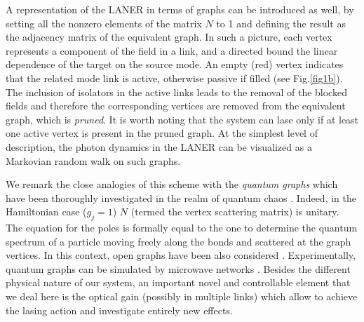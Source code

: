 \documentclass[aps,prl,twocolumn,showpacs,amsmath,amssymb,floatfix,superscriptaddress,
]{revtex4-1}
\begin{document}
A representation of the LANER in terms of graphs can be introduced as well, by setting all the nonzero elements of the matrix $N$ to 1 and defining the result as the adjacency matrix of the equivalent graph. In such a picture, each vertex represents a component of the field in a link, and a directed bound the linear dependence of the target on the source mode. An empty (red) vertex indicates that the related mode link is active, otherwise passive if filled (see Fig.\ref{fig1b}).  The inclusion of isolators in the active links leads to the removal of the blocked fields and therefore the corresponding vertices are removed from the equivalent graph, which is {\it pruned}. It is worth noting that the system can lase only if at least one active vertex is present in the pruned graph. At the simplest level of description, the photon dynamics in the LANER can be visualized as a Markovian random walk \cite{Burioni2005} on such graphs. 

We remark the close analogies of this scheme with the \textit{quantum graphs} which have been thoroughly investigated in the realm of quantum chaos  \cite{kuchment2004quantum,kottos1999periodic}. Indeed, in the Hamiltonian case ($g_j=1$) $N$ (termed the vertex scattering matrix) is unitary. The equation for the poles is formally equal to the one to determine the quantum spectrum of a particle moving freely along the bonds and scattered at the graph vertices. In this context, open graphs have been also considered \cite{barra2001transport,kottos2003quantum}. 
Experimentally, quantum graphs can be simulated by microwave networks \cite{hul2004experimental}. Besides the different physical
nature of our system, an important novel and controllable element 
that we deal here is the optical gain (possibly in multiple links) which allow to achieve the lasing action and investigate entirely new effects. 
\end{document}
